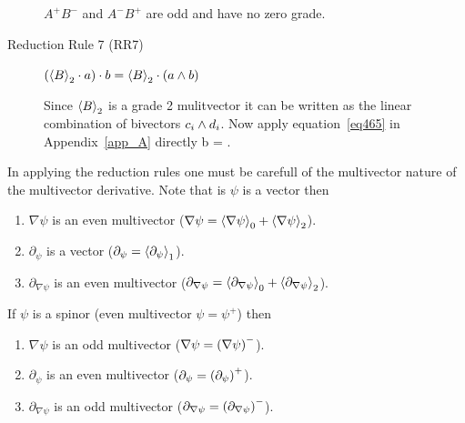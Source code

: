 \begin{description}
	$A^{+}B^{-}$ and $A^{-}B^{+}$ are odd and have no zero grade.
	\item[Reduction Rule 7 (RR7)] $\left ( {\left \langle {B} \right \rangle_{2}\cdot a} \right )\cdot b = \left \langle {B} \right \rangle_{2}\cdot\left ( {a\wedge b} \right )$
	
	Since $\left \langle {B} \right \rangle_{2}$ is a grade 2 mulitvector it can be written as the linear combination of bivectors $c_{i}\wedge d_{i}$. Now
	apply equation~\ref{eq465} in Appendix~\ref{app_A} directly
	\be
		\cdot b = \cdot{}.
	\ee 
\end{description}

In applying the reduction rules one must be carefull of the multivector nature of the multivector derivative.  Note that is
$\psi$ is a vector then
\begin{enumerate}
	\item $\nabla\psi$ is an even multivector ($\nabla\psi = \left \langle {\nabla\psi} \right \rangle_{0}+\left \langle {\nabla\psi} \right \rangle_{2}$).
	\item $\partial_{\psi}$ is a vector ($\partial_{\psi} = \left \langle {\partial_{\psi}} \right \rangle_{1}$).
	\item $\partial_{\nabla\psi}$ is an even multivector ($\partial_{\nabla\psi} = \left \langle {\partial_{\nabla\psi}} \right \rangle_{0}+\left \langle {\partial_{\nabla\psi}} \right \rangle_{2}$).
\end{enumerate}  
If $\psi$ is a spinor (even multivector $\psi = \psi^{+}$) then
\begin{enumerate}
	\item $\nabla\psi$ is an odd multivector ($\nabla\psi = \left ( {\nabla\psi} \right )^{-}$).
	\item $\partial_{\psi}$ is an even multivector ($\partial_{\psi} = \left ( {\partial_{\psi}} \right )^{+}$).
	\item $\partial_{\nabla\psi}$ is an odd multivector ($\partial_{\nabla\psi} = \left ( {\partial_{\nabla\psi}} \right )^{-}$).
\end{enumerate}

